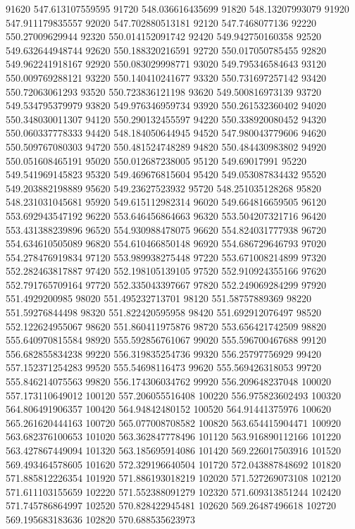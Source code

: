{91620 547.613107559595
91720 548.036616435699
91820 548.13207993079
91920 547.911179835557
92020 547.702880513181
92120 547.7468077136
92220 550.27009629944
92320 550.014152091742
92420 549.942750160358
92520 549.632644948744
92620 550.188320216591
92720 550.017050785455
92820 549.962241918167
92920 550.083029998771
93020 549.795346584643
93120 550.009769288121
93220 550.140410241677
93320 550.731697257142
93420 550.72063061293
93520 550.723836121198
93620 549.500816973139
93720 549.534795379979
93820 549.976346959734
93920 550.261532360402
94020 550.348030011307
94120 550.290132455597
94220 550.338920080452
94320 550.060337778333
94420 548.184050644945
94520 547.980043779606
94620 550.509767080303
94720 550.481524748289
94820 550.484430983802
94920 550.051608465191
95020 550.012687238005
95120 549.69017991
95220 549.541969145823
95320 549.469676815604
95420 549.053087834432
95520 549.203882198889
95620 549.23627523932
95720 548.251035128268
95820 548.231031045681
95920 549.615112982314
96020 549.664816659505
96120 553.692943547192
96220 553.646456864663
96320 553.504207321716
96420 553.431388239896
96520 554.930988478075
96620 554.824031777938
96720 554.634610505089
96820 554.610466850148
96920 554.686729646793
97020 554.278476919834
97120 553.989938275448
97220 553.671008214899
97320 552.282463817887
97420 552.198105139105
97520 552.910924355166
97620 552.791765709164
97720 552.335043397667
97820 552.249069284299
97920 551.4929200985
98020 551.495232713701
98120 551.58757889369
98220 551.59276844498
98320 551.822420595958
98420 551.692912076497
98520 552.122624955067
98620 551.860411975876
98720 553.656421742509
98820 555.640970815584
98920 555.592856761067
99020 555.596700467688
99120 556.682855834238
99220 556.319835254736
99320 556.25797756929
99420 557.152371254283
99520 555.54698116473
99620 555.569426318053
99720 555.846214075563
99820 556.174306034762
99920 556.209648237048
100020 557.173110649012
100120 557.206055516408
100220 556.975823602493
100320 564.806491906357
100420 564.94842480152
100520 564.91441375976
100620 565.261620444163
100720 565.077008708582
100820 563.654415904471
100920 563.682376100653
101020 563.362847778496
101120 563.916890112166
101220 563.427867449094
101320 563.185695914086
101420 569.226017503916
101520 569.493464578605
101620 572.329196640504
101720 572.043887848692
101820 571.885812226354
101920 571.886193018219
102020 571.527269073108
102120 571.611103155659
102220 571.552388091279
102320 571.609313851244
102420 571.745786864997
102520 570.828422945481
102620 569.26487496618
102720 569.195683183636
102820 570.688535623973
}
